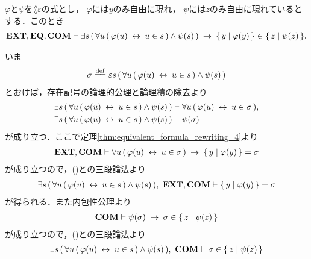 	\begin{screen}
		\begin{thm}
		\label{thm:equivalent_formula_rewriting_12}
			$\varphi$と$\psi$を$\lang{\varepsilon}$の式とし，
			$\varphi$には$y$のみ自由に現れ，
			$\psi$には$z$のみ自由に現れているとする．このとき
			\begin{align}
				\mbox{{\bf EXT}},\mbox{{\bf EQ}},\mbox{\bf COM} \vdash \exists s\, (\, \forall u\, (\, \varphi(u) \hspace{0.25em}\leftrightarrow\hspace{0.25em} u \in s\, ) \wedge \psi(s)\, ) \hspace{0.25em}\rightarrow\hspace{0.25em} \{\, y \mid \varphi(y)\, \} \in \{\, z \mid \psi(z)\, \}.
			\end{align}
		\end{thm}
	\end{screen}
	
	\begin{sketch}
		いま
		\begin{align}
			\sigma \defeq \varepsilon s\, (\, \forall u\, (\, \varphi(u) \lrarrow u \in s\, ) \wedge \psi(s)\, )
		\end{align}
		とおけば，存在記号の論理的公理と論理積の除去より
		\begin{align}
			\exists s\, (\, \forall u\, (\, \varphi(u) \hspace{0.25em}\leftrightarrow\hspace{0.25em} u \in s\, ) \wedge \psi(s)\, )
			&\vdash \forall u\, (\, \varphi(u) \hspace{0.25em}\leftrightarrow\hspace{0.25em} u \in \sigma\, ), 
			\label{fom:equivalent_formula_rewriting_12_1} \\
			\exists s\, (\, \forall u\, (\, \varphi(u) \hspace{0.25em}\leftrightarrow\hspace{0.25em} u \in s\, ) \wedge \psi(s)\, )
			&\vdash \psi(\sigma)
			\label{fom:equivalent_formula_rewriting_12_2}
		\end{align}
		が成り立つ．ここで定理\ref{thm:equivalent_formula_rewriting_4}より
		\begin{align}
			\mbox{{\bf EXT}},\mbox{\bf COM} \vdash \forall u\, (\, \varphi(u) \hspace{0.25em}\leftrightarrow\hspace{0.25em} u \in \sigma\, )
			\hspace{0.25em}\rightarrow\hspace{0.25em} \{\, y \mid \varphi(y)\, \} = \sigma
		\end{align}
		が成り立つので，()との三段論法より
		\begin{align}
			\exists s\, (\, \forall u\, (\, \varphi(u) \hspace{0.25em}\leftrightarrow\hspace{0.25em} u \in s\, ) \wedge \psi(s)\, ),\ \mbox{{\bf EXT}},\mbox{\bf COM} \vdash \{\, y \mid \varphi(y)\, \} = \sigma
			\label{fom:equivalent_formula_rewriting_12_3}
		\end{align}
		が得られる．また内包性公理より
		\begin{align}
			\mbox{\bf COM} \vdash \psi(\sigma) \hspace{0.25em}\rightarrow\hspace{0.25em} \sigma \in \{\, z \mid \psi(z)\, \}
		\end{align}
		が成り立つので，()との三段論法より
		\begin{align}
			\exists s\, (\, \forall u\, (\, \varphi(u) \lrarrow u \in s\, ) \wedge \psi(s)\, ),\ \COMAX \vdash \sigma \in \Set{z}{\psi(z)}

\end{align}
\end{sketch}
